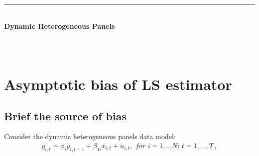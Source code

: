 \documentclass[12pt,a4paper,hyperref]{article}
\begin{document}
\begin{titlepage}

\newcommand{\HRule}{\rule{\linewidth}{0.5mm}} %

\center %



\HRule \\[0.4cm]
{ \huge \bfseries Dynamic Heterogeneous Panels }\\[0.4cm] %
\HRule \\[1.5cm]


\vfill %

\end{titlepage}

\newpage
\tableofcontents
\newpage
\section{Asymptotic bias of LS estimator}
\subsection{Brief the source of bias}
Consider the dynamic heterogeneous panels data model:
\begin{align}
y_{i,t}=\phi_{i} y_{i,t-1}+ \beta_{1i}x_{i,t}+u_{i,t}, \,\, for\,\,i=1,\ldots N;\,t=1,\ldots,T\, , \label{1}
\end{align}
\end{document}
